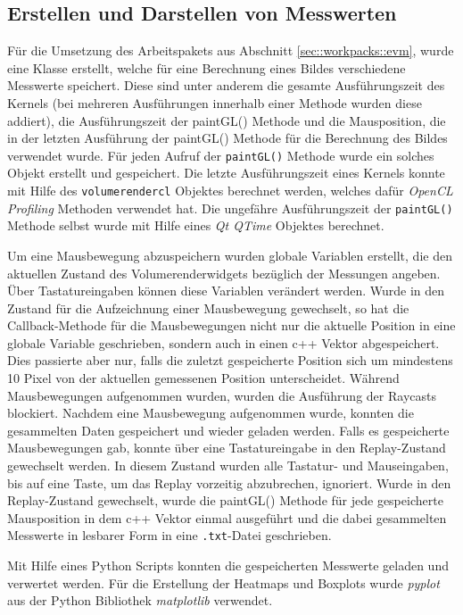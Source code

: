 \subsection{Erstellen und Darstellen von Messwerten}
Für die Umsetzung des Arbeitspakets aus Abschnitt \ref{sec::workpacks::evm}, wurde eine Klasse erstellt, welche für eine Berechnung eines Bildes verschiedene Messwerte speichert.
Diese sind unter anderem die gesamte Ausführungszeit des Kernels (bei mehreren Ausführungen innerhalb einer Methode wurden diese addiert), die Ausführungszeit der paintGL() Methode und die Mausposition, die in der letzten Ausführung der paintGL() Methode für die Berechnung des Bildes verwendet wurde.
Für jeden Aufruf der \texttt{paintGL()} Methode wurde ein solches Objekt erstellt und gespeichert.
Die letzte Ausführungszeit eines Kernels konnte mit Hilfe des \texttt{volumerendercl} Objektes berechnet werden, welches dafür \emph{OpenCL Profiling} Methoden verwendet hat.
Die ungefähre Ausführungszeit der \texttt{paintGL()} Methode selbst wurde mit Hilfe eines \emph{Qt QTime} Objektes berechnet.

Um eine Mausbewegung abzuspeichern wurden globale Variablen erstellt, die den aktuellen Zustand des Volumerenderwidgets bezüglich der Messungen angeben.
Über Tastatureingaben können diese Variablen verändert werden.
Wurde in den Zustand für die Aufzeichnung einer Mausbewegung gewechselt, so hat die Callback-Methode für die Mausbewegungen nicht nur die aktuelle Position in eine globale Variable geschrieben, sondern auch in einen c++ Vektor abgespeichert.
Dies passierte aber nur, falls die zuletzt gespeicherte Position sich um mindestens 10 Pixel von der aktuellen gemessenen Position unterscheidet.
Während Mausbewegungen aufgenommen wurden, wurden die Ausführung der Raycasts blockiert.
Nachdem eine Mausbewegung aufgenommen wurde, konnten die gesammelten Daten gespeichert und wieder geladen werden.
Falls es gespeicherte Mausbewegungen gab, konnte über eine Tastatureingabe in den Replay-Zustand gewechselt werden.
In diesem Zustand wurden alle Tastatur- und Mauseingaben, bis auf eine Taste, um das Replay vorzeitig abzubrechen, ignoriert.
Wurde in den Replay-Zustand gewechselt, wurde die paintGL() Methode für jede gespeicherte Mausposition in dem c++ Vektor einmal ausgeführt und die dabei gesammelten Messwerte in lesbarer Form in eine \texttt{.txt}-Datei geschrieben.

Mit Hilfe eines Python Scripts konnten die gespeicherten Messwerte geladen und verwertet werden.
Für die Erstellung der Heatmaps und Boxplots wurde \emph{pyplot} aus der Python Bibliothek \emph{matplotlib} verwendet.